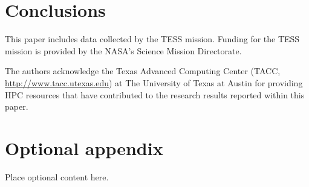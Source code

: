 \documentclass[modern]{aastex631}
\begin{document}
\section{Conclusions}

\begin{acknowledgements}
This paper includes data collected by the TESS mission. Funding for the TESS mission is provided by the NASA's Science Mission Directorate.

The authors acknowledge the Texas Advanced Computing Center (TACC, \url{http://www.tacc.utexas.edu}) at The University of Texas at Austin for providing HPC resources that have contributed to the research results reported within this paper.
\end{acknowledgements}

\clearpage








\clearpage

\appendix
\restartappendixnumbering

\section{Optional appendix} \label{appendix:tools}

Place optional content here.
\end{document}
